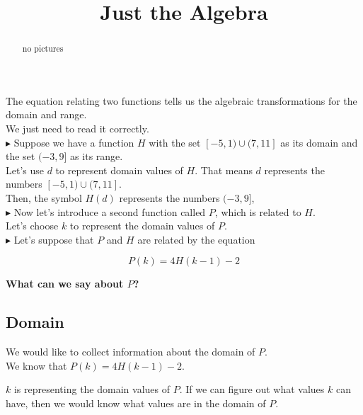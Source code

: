 \documentclass{ximera}
\title{Just the Algebra}
\begin{document}
\begin{abstract}
no pictures
\end{abstract}
\maketitle




The equation relating two functions tells us the algebraic transformations for the domain and range. \\

We just need to read it correctly. \\



\textbf{\textcolor{blue!55!black}{$\blacktriangleright$}}  Suppose we have a function $H$ with the set $[-5, 1) \cup (7, 11]$ as its domain and the set $(-3, 9]$ as its range. \\

Let's use $d$ to represent domain values of $H$.  That means $d$ represents the numbers $[-5, 1) \cup (7, 11]$. \\

Then, the symbol $H(d)$ represents the numbers $(-3, 9]$, \\


\textbf{\textcolor{blue!55!black}{$\blacktriangleright$}} Now let's introduce a second function called $P$, which is related to $H$. \\

Let's choose $k$ to represent the domain values of $P$. \\


\textbf{\textcolor{blue!55!black}{$\blacktriangleright$}} Let's suppose that $P$ and $H$ are related by the equation 

\[ 
P(k) = 4 H(k-1) - 2
\]



\textbf{\textcolor{blue!55!black}{What can we say about $P$?}}  \\



\subsection*{Domain}


We would like to collect information about the domain of $P$. \\

We know that $P(k) = 4 H(k-1) - 2$.

$k$ is representing the domain values of $P$.  If we can figure out what values $k$ can have, then we would know what values are in the domain of $P$. \\
\end{document}
